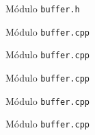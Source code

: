 \begin{frame}[fragile]{Módulo \texttt{buffer.h}}
\end{frame}

\begin{frame}[fragile]{Módulo \texttt{buffer.cpp}}
\end{frame}

\begin{frame}[fragile]{Módulo \texttt{buffer.cpp}}
\end{frame}

\begin{frame}[fragile]{Módulo \texttt{buffer.cpp}}
\end{frame}

\begin{frame}[fragile]{Módulo \texttt{buffer.cpp}}
\end{frame}

\begin{frame}[fragile]{Módulo \texttt{buffer.cpp}}
\end{frame}
